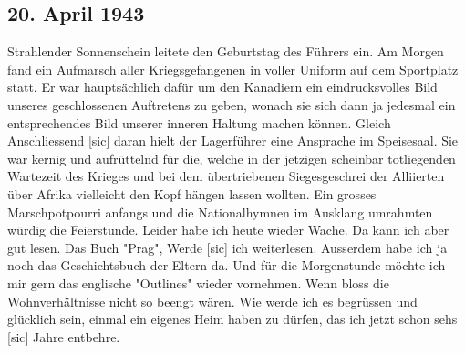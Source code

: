 \subsection{20. April 1943}

Strahlender Sonnenschein leitete den Geburtstag des F\"{u}hrers ein.
Am Morgen fand ein Aufmarsch aller Kriegsgefangenen in voller Uniform auf dem Sportplatz statt.
Er war haupts\"{a}chlich daf\"{u}r um den Kanadiern ein eindrucksvolles Bild unseres geschlossenen Auftretens zu geben, wonach sie sich dann ja jedesmal ein entsprechendes Bild unserer inneren Haltung machen k\"{o}nnen.
Gleich Anschliessend{\color{red} [sic] } daran hielt der Lagerf\"{u}hrer eine Ansprache im Speisesaal.
Sie war kernig und aufr\"{u}ttelnd f\"{u}r die, welche in der jetzigen scheinbar totliegenden Wartezeit des Krieges und bei dem \"{u}bertriebenen Siegesgeschrei der Alliierten  \"{u}ber Afrika vielleicht den Kopf h\"{a}ngen lassen wollten.
Ein grosses Marschpotpourri anfangs und die Nationalhymnen im Ausklang umrahmten w\"{u}rdig die Feierstunde.
Leider habe ich heute wieder Wache.
Da kann ich aber gut lesen.
Das Buch "Prag", Werde{\color{red} [sic] } ich weiterlesen.
Ausserdem habe ich ja noch das Geschichtsbuch der Eltern da.
Und f\"{u}r die Morgenstunde m\"{o}chte ich mir gern das englische "Outlines" wieder vornehmen.
Wenn bloss die Wohnverh\"{a}ltnisse nicht so beengt w\"{a}ren.
Wie werde ich es begr\"{u}ssen  und gl\"{u}cklich sein, einmal ein eigenes Heim haben zu d\"{u}rfen, das ich jetzt schon sehs{\color{red} [sic] } Jahre entbehre.

\clearpage
